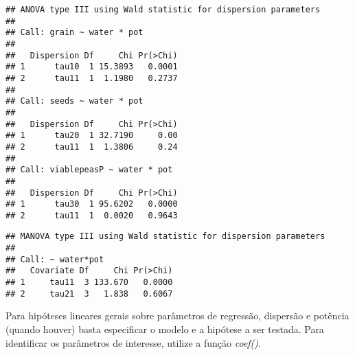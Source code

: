 \begin{knitrout}
\color{fgcolor}\begin{kframe}
\begin{alltt}
               \hlstd{=} \hlstd{(}\hlstd{(}\hlstd{,}\hlstd{),} \hlstd{(}\hlstd{,}\hlstd{),} \hlstd{(}\hlstd{,}\hlstd{)),}
               \hlstd{=} \hlstd{(}\hlstd{(}\hlstd{,} \hlstd{),}
                           \hlstd{(}\hlstd{,} \hlstd{),}
                           \hlstd{(}\hlstd{,} \hlstd{)))}
\end{alltt}
\begin{verbatim}
## ANOVA type III using Wald statistic for dispersion parameters
## 
## Call: grain ~ water * pot
## 
##   Dispersion Df     Chi Pr(>Chi)
## 1      tau10  1 15.3893   0.0001
## 2      tau11  1  1.1980   0.2737
## 
## Call: seeds ~ water * pot
## 
##   Dispersion Df     Chi Pr(>Chi)
## 1      tau20  1 32.7190     0.00
## 2      tau11  1  1.3806     0.24
## 
## Call: viablepeasP ~ water * pot
## 
##   Dispersion Df     Chi Pr(>Chi)
## 1      tau30  1 95.6202   0.0000
## 2      tau11  1  0.0020   0.9643
\end{verbatim}
\begin{alltt}
               \hlstd{=} \hlstd{(}\hlstd{,}\hlstd{),}
               \hlstd{=} \hlstd{(}\hlstd{,} \hlstd{))}
\end{alltt}
\begin{verbatim}
## MANOVA type III using Wald statistic for dispersion parameters
## 
## Call: ~ water*pot
##   Covariate Df     Chi Pr(>Chi)
## 1     tau11  3 133.670   0.0000
## 2     tau21  3   1.838   0.6067
\end{verbatim}
\end{kframe}
\end{knitrout}

Para hipóteses lineares gerais sobre parâmetros de regressão, dispersão e potência (quando houver) basta especificar o modelo e a hipótese a ser testada. Para identificar os parâmetros de interesse, utilize a função \emph{coef()}.

